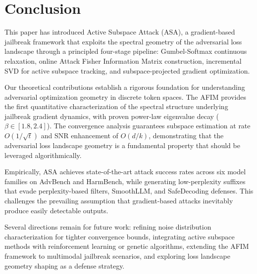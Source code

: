 ﻿\documentclass[lettersize,journal]{IEEEtran}
\begin{document}

\section{Conclusion}
\label{sec:conclusion}

This paper has introduced Active Subspace Attack (ASA), a gradient-based jailbreak framework that exploits the spectral geometry of the adversarial loss landscape through a principled four-stage pipeline: Gumbel-Softmax continuous relaxation, online Attack Fisher Information Matrix construction, incremental SVD for active subspace tracking, and subspace-projected gradient optimization.

Our theoretical contributions establish a rigorous foundation for understanding adversarial optimization geometry in discrete token spaces. The AFIM provides the first quantitative characterization of the spectral structure underlying jailbreak gradient dynamics, with proven power-law eigenvalue decay ($\beta \in [1.8, 2.4]$). The convergence analysis guarantees subspace estimation at rate $O(1/\sqrt{t})$ and SNR enhancement of $O(d/k)$, demonstrating that the adversarial loss landscape geometry is a fundamental property that should be leveraged algorithmically.

Empirically, ASA achieves state-of-the-art attack success rates across six model families on AdvBench and HarmBench, while generating low-perplexity suffixes that evade perplexity-based filters, SmoothLLM, and SafeDecoding defenses. This challenges the prevailing assumption that gradient-based attacks inevitably produce easily detectable outputs.

Several directions remain for future work: refining noise distribution characterization for tighter convergence bounds, integrating active subspace methods with reinforcement learning or genetic algorithms, extending the AFIM framework to multimodal jailbreak scenarios, and exploring loss landscape geometry shaping as a defense strategy.





\end{document}
